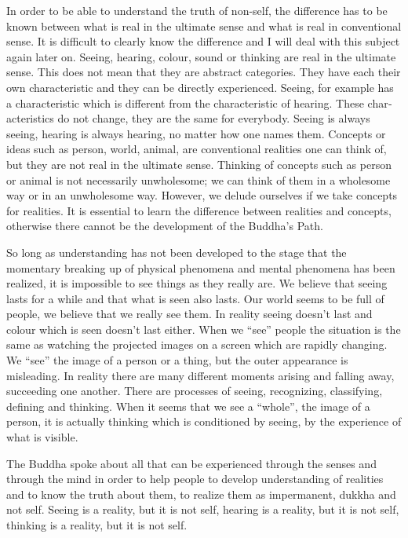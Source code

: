 \documentclass{book}
\begin{document}
In order to be able to understand the truth of non-self, the difference
has to be known between what is real in the ultimate sense and what is
real in conventional sense. It is difficult to clearly know the
difference and I will deal with this subject again later on. Seeing,
hearing, colour, sound or thinking are real in the ultimate sense. This
does not mean that they are abstract categories. They have each their
own characteristic and they can be directly expe­rienced. Seeing, for
example has a characteristic which is different from the characteristic
of hearing. These char­acter­istics do not change, they are the same for
everybody. Seeing is always seeing, hearing is always hearing, no matter
how one names them. Concepts or ideas such as person, world, animal, are
conventional realities one can think of, but they are not real in the
ultimate sense. Thinking of concepts such as person or animal is not
necessarily unwholesome; we can think of them in a wholesome way or in
an unwholesome way. However, we delude ourselves if we take concepts for
realities. It is essential to learn the difference between realities and
concepts, otherwise there cannot be the development of the Buddha's
Path.

So long as understanding has not been developed to the stage that the
momentary breaking up of physical phenomena and mental phenomena has
been realized, it is impossible to see things as they really are. We
believe that seeing lasts for a while and that what is seen also lasts.
Our world seems to be full of people, we believe that we really see
them. In reality seeing doesn't last and colour which is seen doesn't
last either. When we ``see'' people the situation is the same as
watching the projected images on a screen which are rapidly changing. We
``see'' the image of a person or a thing, but the outer appearance is
misleading. In reality there are many different moments arising and
falling away, succeeding one another. There are processes of seeing,
recognizing, classifying, defining and thinking. When it seems that we
see a ``whole'', the image of a person, it is actually thinking which is
conditioned by seeing, by the experience of what is visible.

The Buddha spoke about all that can be experienced through the senses
and through the mind in order to help people to develop understanding of
realities and to know the truth about them, to realize them as
impermanent, dukkha and not self. Seeing is a reality, but it is not
self, hearing is a reality, but it is not self, thinking is a reality,
but it is not self.
\end{document}
